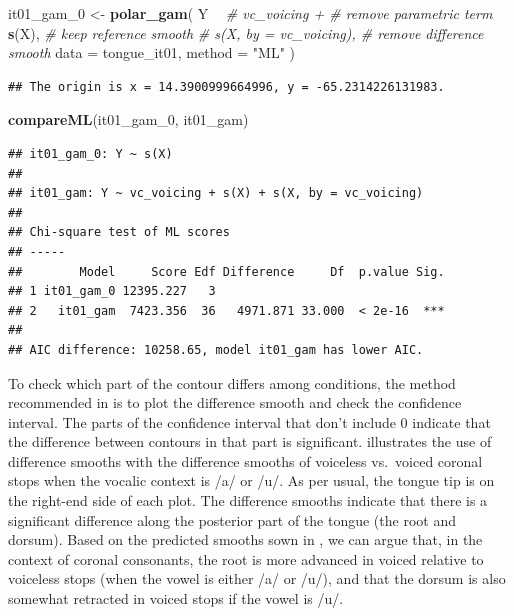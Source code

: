\documentclass[11pt,]{article}
\newenvironment{Shaded}{\begin{snugshade}}{\end{snugshade}}
\newcommand{\CommentTok}[1]{\textcolor[rgb]{0.56,0.35,0.01}{\textit{#1}}}
\newcommand{\DataTypeTok}[1]{\textcolor[rgb]{0.13,0.29,0.53}{#1}}
\newcommand{\DecValTok}[1]{\textcolor[rgb]{0.00,0.00,0.81}{#1}}
\newcommand{\KeywordTok}[1]{\textcolor[rgb]{0.13,0.29,0.53}{\textbf{#1}}}
\newcommand{\NormalTok}[1]{#1}
\newcommand{\OperatorTok}[1]{\textcolor[rgb]{0.81,0.36,0.00}{\textbf{#1}}}
\newcommand{\StringTok}[1]{\textcolor[rgb]{0.31,0.60,0.02}{#1}}
\begin{document}
\begin{Shaded}
\begin{Highlighting}[]
\NormalTok{it01_gam_}\DecValTok{0}\NormalTok{ <-}\StringTok{ }\KeywordTok{polar_gam}\NormalTok{(}
\NormalTok{  Y }\OperatorTok{~}
\StringTok{    }\CommentTok{# vc_voicing +            # remove parametric term}
\StringTok{    }\KeywordTok{s}\NormalTok{(X),                     }\CommentTok{# keep reference smooth}
    \CommentTok{# s(X, by = vc_voicing),  # remove difference smooth}
  \DataTypeTok{data =}\NormalTok{ tongue_it01,}
  \DataTypeTok{method =} \StringTok{"ML"}
\NormalTok{)}
\end{Highlighting}
\end{Shaded}

\begin{verbatim}
## The origin is x = 14.3900999664996, y = -65.2314226131983.
\end{verbatim}

\begin{Shaded}
\begin{Highlighting}[]
\KeywordTok{compareML}\NormalTok{(it01_gam_}\DecValTok{0}\NormalTok{, it01_gam)}
\end{Highlighting}
\end{Shaded}

\begin{verbatim}
## it01_gam_0: Y ~ s(X)
## 
## it01_gam: Y ~ vc_voicing + s(X) + s(X, by = vc_voicing)
## 
## Chi-square test of ML scores
## -----
##        Model     Score Edf Difference     Df  p.value Sig.
## 1 it01_gam_0 12395.227   3                                
## 2   it01_gam  7423.356  36   4971.871 33.000  < 2e-16  ***
## 
## AIC difference: 10258.65, model it01_gam has lower AIC.
\end{verbatim}

To check which part of the contour differs among conditions, the method
recommended in \citet{soskuthy2017} is to plot the difference smooth and
check the confidence interval. The parts of the confidence interval that
don't include 0 indicate that the difference between contours in that
part is significant.  illustrates the use of
difference smooths with the difference smooths of voiceless vs.~voiced
coronal stops when the vocalic context is /a/ or /u/. As per usual, the
tongue tip is on the right-end side of each plot. The difference smooths
indicate that there is a significant difference along the posterior part
of the tongue (the root and dorsum). Based on the predicted smooths sown
in , we can argue that, in the context of coronal
consonants, the root is more advanced in voiced relative to voiceless
stops (when the vowel is either /a/ or /u/), and that the dorsum is also
somewhat retracted in voiced stops if the vowel is /u/.
\end{document}
